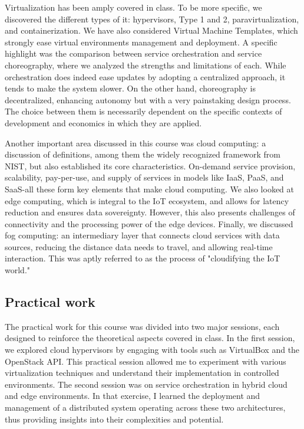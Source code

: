 \indent \indent Virtualization has been amply covered in class. To be more specific, we discovered the different types of it: hypervisors, Type 1 and 2, paravirtualization, and containerization. We have also considered Virtual Machine Templates, which strongly ease virtual environments management and deployment. A specific highlight was the comparison between service orchestration and service choreography, where we analyzed the strengths and limitations of each. While orchestration does indeed ease updates by adopting a centralized approach, it tends to make the system slower. On the other hand, choreography is decentralized, enhancing autonomy but with a very painstaking design process. The choice between them is necessarily dependent on the specific contexts of development and economics in which they are applied.\\
\vspace{0.25cm}

Another important area discussed in this course was cloud computing: a discussion of definitions, among them the widely recognized framework from NIST, but also established its core characteristics. On-demand service provision, scalability, pay-per-use, and supply of services in models like IaaS, PaaS, and SaaS-all these form key elements that make cloud computing. We also looked at edge computing, which is integral to the IoT ecosystem, and allows for latency reduction and ensures data sovereignty. However, this also presents challenges of connectivity and the processing power of the edge devices. Finally, we discussed fog computing: an intermediary layer that connects cloud services with data sources, reducing the distance data needs to travel, and allowing real-time interaction. This was aptly referred to as the process of "cloudifying the IoT world."

\subsection{Practical work}
\indent \indent The practical work for this course was divided into two major sessions, each designed to reinforce the theoretical aspects covered in class. In the first session, we explored cloud hypervisors by engaging with tools such as VirtualBox and the OpenStack API. This practical session allowed me to experiment with various virtualization techniques and understand their implementation in controlled environments. The second session was on service orchestration in hybrid cloud and edge environments. In that exercise, I learned the deployment and management of a distributed system operating across these two architectures, thus providing insights into their complexities and potential.
\vspace{0.25cm}

